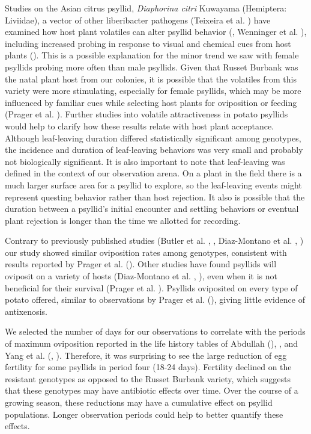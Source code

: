 \documentclass{UIdahoMastersThesis}
\begin{document}
Studies on the Asian citrus psyllid, \textit{Diaphorina citri} Kuwayama (Hemiptera: Liviidae), a vector of other liberibacter pathogens (Teixeira et al. \citeyear{Teixeira2005}) have examined how host plant volatiles can alter psyllid behavior (\cite{Davidson2014}, Wenninger et al. \citeyear{Wenninger2009}), including increased probing in response to visual and chemical cues from host plants (\cite{Patt2011}). This is a possible explanation for the minor trend we saw with female psyllids probing more often than male psyllids. Given that Russet Burbank was the natal plant host from our colonies, it is possible that the volatiles from this variety were more stimulating, especially for female psyllids, which may be more influenced by familiar cues while selecting host plants for oviposition or feeding (Prager et al. \citeyear{Prager2014a}). Further studies into volatile attractiveness in potato psyllids would help to clarify how these results relate with host plant acceptance. 
Although leaf-leaving duration differed statistically significant among genotypes, the incidence and duration of leaf-leaving behaviors was very small and probably not biologically significant. It is also important to note that leaf-leaving was defined in the context of our observation arena. On a plant in the field there is a much larger surface area for a psyllid to explore, so the leaf-leaving events might represent questing behavior rather than host rejection. It also is possible that the duration between a psyllid’s initial encounter and settling behaviors or eventual plant rejection is longer than the time we allotted for recording.

Contrary to previously published studies (Butler et al. \citeyear{Butler2011}, \cite{Cooper2014}, Diaz-Montano et al. \citeyear{Diaz-Montano2013}, \cite{Rubio-Covarrubias2017}) our study showed similar oviposition rates among genotypes, consistent with results reported by Prager et al. (\citeyear{Prager2017}). Other studies have found psyllids will oviposit on a variety of hosts (Diaz-Montano et al. \citeyear{Diaz-Montano2013}, \cite{Thinakaran2015}), even when it is not beneficial for their survival (Prager et al. \citeyear{Prager2014b}). Psyllids oviposited on every type of potato offered, similar to observations by Prager et al. (\citeyear{Prager2017}), giving little evidence of antixenosis.

We selected the number of days for our observations to correlate with the periods of maximum oviposition reported in the life history tables of Abdullah (\citeyear{Abdullah2008}), \cite{Knowlton1931}, and Yang et al. (\citeyear{Yang2010}, \citeyear{Yang2013}). Therefore, it was surprising to see the large reduction of egg fertility for some psyllids in period four (18-24 days). Fertility declined on the resistant genotypes as opposed to the Russet Burbank variety, which suggests that these genotypes may have antibiotic effects over time. Over the course of a growing season, these reductions may have a cumulative effect on psyllid populations. Longer observation periods could help to better quantify these effects.
\end{document}
